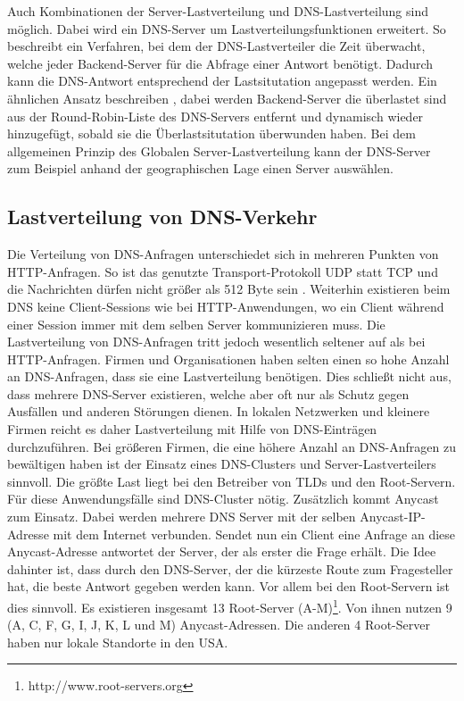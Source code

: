 \documentclass[a4paper, 12pt, BCOR10mm, DIV12, toc=bibliography, toc=listof, german]{scrbook}
\begin{document}
			Auch Kombinationen der Server-Lastverteilung und DNS-Lastverteilung sind möglich. Dabei wird ein
			DNS-Server um Lastverteilungsfunktionen erweitert. So beschreibt \cite{chyuyi2003} ein
			Verfahren, bei dem der DNS-Lastverteiler die Zeit überwacht, welche jeder Backend-Server für
			die Abfrage einer Antwort benötigt. Dadurch kann die DNS-Antwort entsprechend der
			Lastsitutation angepasst werden. Ein ähnlichen Ansatz beschreiben \cite{mookim2005}, dabei
			werden Backend-Server die überlastet sind aus der Round-Robin-Liste des DNS-Servers entfernt
			und dynamisch wieder hinzugefügt, sobald sie die Überlastsitutation überwunden haben. Bei dem
			allgemeinen Prinzip des Globalen Server-Lastverteilung \cite{bourke2001} kann der DNS-Server
			zum Beispiel anhand der geographischen Lage einen Server auswählen.

			
			\subsection*{Lastverteilung von DNS-Verkehr} %

			Die Verteilung von DNS-Anfragen unterschiedet sich in mehreren Punkten von HTTP-Anfragen. So
			ist das genutzte Transport-Protokoll UDP statt TCP und die Nachrichten dürfen nicht größer als
			512 Byte sein \cite{rfc1035}. Weiterhin existieren beim DNS keine Client-Sessions wie bei
			HTTP-Anwendungen, wo ein Client während einer Session immer mit dem selben Server
			kommunizieren muss. Die Lastverteilung von DNS-Anfragen tritt jedoch wesentlich seltener auf
			als bei HTTP-Anfragen. Firmen und Organisationen haben selten einen so hohe Anzahl an
			DNS-Anfragen, dass sie eine Lastverteilung benötigen. Dies schließt nicht aus, dass mehrere
			DNS-Server existieren, welche aber oft nur als Schutz gegen Ausfällen und anderen Störungen
			dienen.  In lokalen Netzwerken und kleinere Firmen reicht es daher Lastverteilung mit Hilfe
			von DNS-Einträgen durchzuführen. Bei größeren Firmen, die eine höhere Anzahl an DNS-Anfragen
			zu bewältigen haben ist der Einsatz eines DNS-Clusters und Server-Lastverteilers sinnvoll. Die
			größte Last liegt bei den Betreiber von TLDs und den Root-Servern. Für diese Anwendungsfälle
			sind DNS-Cluster nötig. Zusätzlich kommt Anycast \cite{rfc4786} zum Einsatz. Dabei werden mehrere DNS Server
			mit der selben Anycast-IP-Adresse mit dem Internet verbunden. Sendet nun ein
			Client eine Anfrage an diese Anycast-Adresse antwortet der Server, der als erster die Frage
			erhält. Die Idee dahinter ist, dass durch den DNS-Server, der die kürzeste Route zum
			Fragesteller hat, die beste Antwort gegeben werden kann. Vor allem bei den Root-Servern ist
			dies sinnvoll. Es existieren insgesamt 13 Root-Server
			(A-M)\footnote{http://www.root-servers.org}. Von ihnen nutzen 9 (A, C, F, G, I, J, K, L und M)
			Anycast-Adressen. Die anderen 4 Root-Server haben nur lokale Standorte in den USA. 
				
\end{document}
